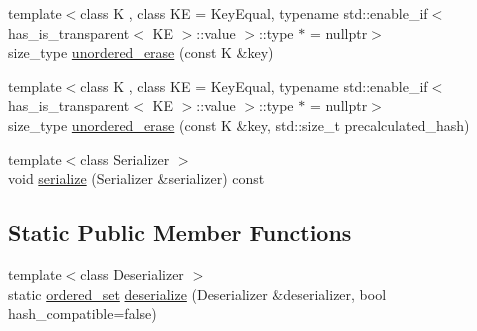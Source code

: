 \begin{DoxyCompactItemize}
\item 
{\footnotesize template$<$class K , class KE  = Key\+Equal, typename std\+::enable\+\_\+if$<$ has\+\_\+is\+\_\+transparent$<$ K\+E $>$\+::value $>$\+::type $\ast$  = nullptr$>$ }\\size\+\_\+type \mbox{\hyperlink{classtsl_1_1ordered__set_a2b30fbcf395a674198bc7943bb04d756}{unordered\+\_\+erase}} (const K \&key)
\item 
{\footnotesize template$<$class K , class KE  = Key\+Equal, typename std\+::enable\+\_\+if$<$ has\+\_\+is\+\_\+transparent$<$ K\+E $>$\+::value $>$\+::type $\ast$  = nullptr$>$ }\\size\+\_\+type \mbox{\hyperlink{classtsl_1_1ordered__set_a979b730573d4d61fd42df217b8bccd20}{unordered\+\_\+erase}} (const K \&key, std\+::size\+\_\+t precalculated\+\_\+hash)
\item 
{\footnotesize template$<$class Serializer $>$ }\\void \mbox{\hyperlink{classtsl_1_1ordered__set_a6a50408f6297bc6ecb05c7a0942bb581}{serialize}} (Serializer \&serializer) const
\end{DoxyCompactItemize}
\subsection*{Static Public Member Functions}
\begin{DoxyCompactItemize}
\item 
{\footnotesize template$<$class Deserializer $>$ }\\static \mbox{\hyperlink{classtsl_1_1ordered__set}{ordered\+\_\+set}} \mbox{\hyperlink{classtsl_1_1ordered__set_aaf995efb5c45de92a8ef1d35f6e7e28e}{deserialize}} (Deserializer \&deserializer, bool hash\+\_\+compatible=false)
\end{DoxyCompactItemize}
